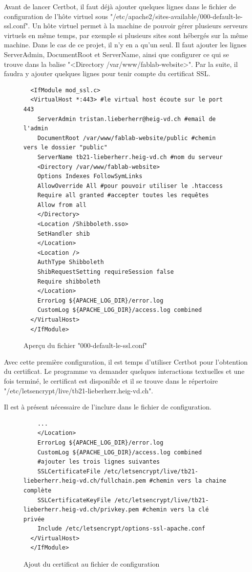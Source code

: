 \documentclass[
    iai, %
    eai, %
]{heig-tb}
\begin{document}
Avant de lancer Certbot, il faut déjà ajouter quelques lignes dans le fichier de configuration de l'hôte virtuel sous "/etc/apache2/sites-available/000-default-le-ssl.conf". Un hôte virtuel permet à la machine de pouvoir gérer plusieurs serveurs virtuels en même temps, par exemple si plusieurs sites sont hébergés sur la même machine. Dans le cas de ce projet, il n'y en a qu'un seul.
Il faut ajouter les lignes ServerAdmin, DocumentRoot et ServerName, ainsi que configurer ce qui se trouve dans la balise "<Directory /var/www/fablab-website>". Par la suite, il faudra y ajouter quelques lignes pour tenir compte du certificat SSL.

\begin{figure}[h]
  \begin{verbatim}
  <IfModule mod_ssl.c>
  <VirtualHost *:443> #le virtual host écoute sur le port 443
    ServerAdmin tristan.lieberherr@heig-vd.ch #email de l'admin
    DocumentRoot /var/www/fablab-website/public #chemin vers le dossier "public"
    ServerName tb21-lieberherr.heig-vd.ch #nom du serveur
    <Directory /var/www/fablab-website>
    Options Indexes FollowSymLinks
    AllowOverride All #pour pouvoir utiliser le .htaccess
    Require all granted #accepter toutes les requêtes
    Allow from all
    </Directory>
    <Location /Shibboleth.sso>
    SetHandler shib
    </Location>
    <Location />
    AuthType Shibboleth
    ShibRequestSetting requireSession false
    Require shibboleth
    </Location>
    ErrorLog ${APACHE_LOG_DIR}/error.log
    CustomLog ${APACHE_LOG_DIR}/access.log combined
  </VirtualHost>
  </IfModule>
  \end{verbatim}
  \caption{Aperçu du fichier "000-default-le-ssl.conf"}
\end{figure}

Avec cette première configuration, il est temps d'utiliser Certbot pour l'obtention du certificat. Le programme va demander quelques interactions textuelles et une fois terminé, le certificat est disponible et il se trouve dans le répertoire "/etc/letsencrypt/live/tb21-lieberherr.heig-vd.ch".

\newpage
Il est à présent nécessaire de l'inclure dans le fichier de configuration.

\begin{figure}[h]
  \begin{verbatim}
    ...
    </Location>
    ErrorLog ${APACHE_LOG_DIR}/error.log
    CustomLog ${APACHE_LOG_DIR}/access.log combined
    #ajouter les trois lignes suivantes
    SSLCertificateFile /etc/letsencrypt/live/tb21-lieberherr.heig-vd.ch/fullchain.pem #chemin vers la chaine complète
    SSLCertificateKeyFile /etc/letsencrypt/live/tb21-lieberherr.heig-vd.ch/privkey.pem #chemin vers la clé privée
    Include /etc/letsencrypt/options-ssl-apache.conf
  </VirtualHost>
  </IfModule>
  \end{verbatim}
  \caption{Ajout du certificat au fichier de configuration}
\end{figure}
\end{document}
